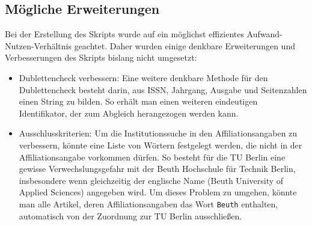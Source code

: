 \subsection{Mögliche Erweiterungen}
Bei der Erstellung des Skripts wurde auf ein möglichst effizientes Aufwand-Nutzen-Verhältnis geachtet. Daher wurden einige denkbare Erweiterungen und Verbesserungen des Skripts bislang nicht umgesetzt:
\begin{itemize}
\item Dublettencheck verbessern: Eine weitere denkbare Methode für den Dublettencheck besteht darin, aus ISSN, Jahrgang, Ausgabe und Seitenzahlen einen String zu bilden. So erhält man einen weiteren eindeutigen Identifikator, der zum Abgleich herangezogen werden kann.
\item Ausschlusskriterien: Um die Institutionssuche in den Affiliationsangaben zu verbessern, könnte eine Liste von Wörtern festgelegt werden, die nicht in der Affiliationsangabe vorkommen dürfen. So besteht für die TU Berlin eine gewisse Verwechslungsgefahr mit der Beuth Hochschule für Technik Berlin, insbesondere wenn gleichzeitig der englische Name (Beuth University of Applied Sciences) angegeben wird. Um dieses Problem zu umgehen, könnte man alle Artikel, deren Affiliationsangaben das Wort \texttt{Beuth} enthalten, automatisch von der Zuordnung zur TU Berlin ausschließen. 
\end{itemize}